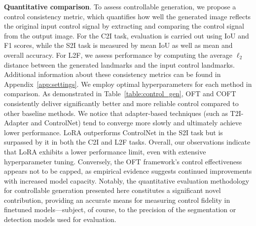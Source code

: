 \textbf{Quantitative comparison}. To assess controllable generation, we propose a control consistency metric, which quantifies how well the generated image reflects the original input control signal by extracting and comparing the control signal from the output image. For the C2I task, evaluation is carried out using IoU and F1 scores, while the S2I task is measured by mean IoU as well as mean and overall accuracy. For L2F, we assess performance by computing the average $\ell_2$ distance between the generated landmarks and the input control landmarks. Additional information about these consistency metrics can be found in Appendix~\ref{app:settings}. We employ optimal hyperparameters for each method in comparison. As demonstrated in Table~\ref{table:control_gen}, OFT and COFT consistently deliver significantly better and more reliable control compared to other baseline methods. We notice that adapter-based techniques (such as T2I-Adapter and ControlNet) tend to converge more slowly and ultimately achieve lower performance. LoRA outperforms ControlNet in the S2I task but is surpassed by it in both the C2I and L2F tasks. Overall, our observations indicate that LoRA exhibits a lower performance limit, even with extensive hyperparameter tuning. Conversely, the OFT framework’s control effectiveness appears not to be capped, as empirical evidence suggests continued improvements with increased model capacity. Notably, the quantitative evaluation methodology for controllable generation presented here constitutes a significant novel contribution, providing an accurate means for measuring control fidelity in finetuned models—subject, of course, to the precision of the segmentation or detection models used for evaluation.

